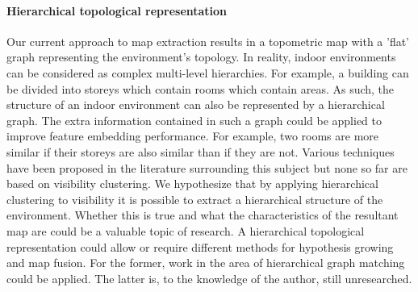 \paragraph{Hierarchical topological representation}
Our current approach to map extraction results in a topometric map with a 'flat' graph representing the environment's topology. In reality, indoor environments can be considered as complex multi-level hierarchies. For example, a building can be divided into storeys which contain rooms which contain areas. As such, the structure of an indoor environment can also be represented by a hierarchical graph. The extra information contained in such a graph could be applied to improve feature embedding performance. For example, two rooms are more similar if their storeys are also similar than if they are not. Various techniques have been proposed in the literature surrounding this subject but none so far are based on visibility clustering. We hypothesize that by applying hierarchical clustering to visibility it is possible to extract a hierarchical structure of the environment. Whether this is true and what the characteristics of the resultant map are could be a valuable topic of research. A hierarchical topological representation could allow or require different methods for hypothesis growing and map fusion. For the former, work in the area of hierarchical graph matching could be applied. The latter is, to the knowledge of the author, still unresearched. 

